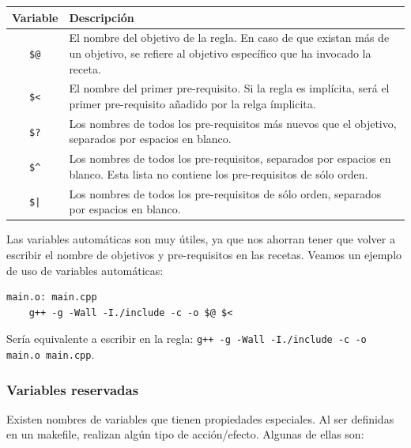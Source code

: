 \documentclass[11pt,twoside,titlepage,a4paper]{article}
\theoremstyle{definition}
\theoremstyle{plain_rojo}
\theoremstyle{remark}
\begin{document}
\begin{center}
\begin{tabular}{|c|p{13.6cm}|}
\hline
		\textbf{\textcolor{burdeos}{Variable}} & 
	\textbf{\textcolor{burdeos}{Descripción}} \\
\hline
	\texttt{\$@} & 
	El nombre del objetivo de la regla. En caso de que existan más de un 
	objetivo, se refiere al objetivo específico que ha invocado la receta.\\
\hline
	\texttt{\$<} &
	El nombre del primer pre-requisito. Si la regla es implícita, será el 
	primer pre-requisito añadido por la relga ímplicita.\\
\hline
	\texttt{\$?} & 
	Los nombres de todos los pre-requisitos más nuevos que el objetivo, 
	separados por espacios en blanco.\\
\hline
	\texttt{\$\^} & 
	Los nombres de todos los pre-requisitos, separados por espacios en 
	blanco. Esta lista no contiene los pre-requisitos de sólo orden.\\
\hline
	\texttt{\$|} & 
	Los nombres de todos los pre-requisitos de sólo orden, separados por 
	espacios en blanco.\\
\hline
\end{tabular}
\end{center}
\bigskip
Las variables automáticas son muy útiles, ya que nos ahorran tener que volver
a escribir el nombre de objetivos y pre-requisitos en las recetas. Veamos un 
ejemplo de uso de variables automáticas:
\bigskip
\begin{lstlisting}
main.o: main.cpp
	g++ -g -Wall -I./include -c -o $@ $<
\end{lstlisting}
\bigskip
Sería equivalente a escribir en la regla: \texttt{g++ -g -Wall -I./include -c
-o main.o main.cpp}.
\subsubsection{Variables reservadas}

Existen nombres de variables que tienen propiedades especiales. Al ser 
definidas en un makefile, realizan algún tipo de acción/efecto. Algunas de 
ellas son:
\end{document}
